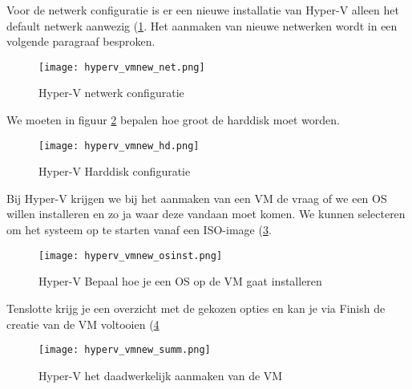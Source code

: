 Voor de netwerk configuratie is er een nieuwe installatie van Hyper-V alleen het default netwerk aanwezig (\ref{HV_vmnew_net}. Het aanmaken van nieuwe netwerken wordt in een volgende paragraaf besproken.
\begin{figure}[H]
	\centering
	\texttt{[image: hyperv\_vmnew\_net.png]}
	\caption{Hyper-V netwerk configuratie}
	\label{HV_vmnew_net}
\end{figure}

We moeten in figuur \ref{HV_vmnew_hd} bepalen hoe groot de harddisk moet worden.
\begin{figure}[H]
	\centering
	\texttt{[image: hyperv\_vmnew\_hd.png]}
	\caption{Hyper-V Harddisk configuratie}
	\label{HV_vmnew_hd}
\end{figure}

Bij Hyper-V krijgen we bij het aanmaken van een VM de vraag of we een OS willen installeren en zo ja waar deze vandaan moet komen. We kunnen selecteren om het systeem op te starten vanaf een ISO-image (\ref{HV_vmnew_os}.
\begin{figure}[H]
	\centering
	\texttt{[image: hyperv\_vmnew\_osinst.png]}
	\caption{Hyper-V Bepaal hoe je een OS op de VM gaat installeren}
	\label{HV_vmnew_os}
\end{figure}

Tenslotte krijg je een overzicht met de gekozen opties en kan je via Finish de creatie van de VM voltooien (\ref{HV_vmnew_finish}
\begin{figure}[H]
	\centering
	\texttt{[image: hyperv\_vmnew\_summ.png]}
	\caption{Hyper-V het daadwerkelijk aanmaken van de VM}
	\label{HV_vmnew_finish}
\end{figure}


